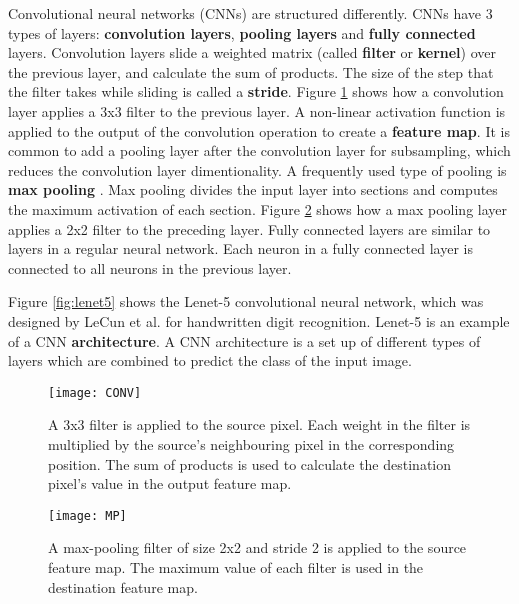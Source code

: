 Convolutional neural networks (CNNs) are structured differently. CNNs have 3 types of layers: \textbf{convolution layers}, \textbf{pooling layers} and \textbf{fully connected} layers. Convolution layers slide a weighted matrix (called \textbf{filter} or \textbf{kernel}) over the previous layer, and calculate the sum of products. The size of the step that the filter takes while sliding is called a \textbf{stride}. Figure \ref{fig:CONV} shows how a convolution layer applies a 3x3 filter to the previous layer. A non-linear activation function is applied to the output of the convolution operation to create a \textbf{feature map}. It is common to add a pooling layer after the convolution layer for subsampling, which reduces the convolution layer dimentionality. A frequently used type of pooling is \textbf{max pooling} \cite{weng1992cresceptron}. Max pooling divides the input layer into sections and computes the maximum activation of each section. Figure \ref{fig:MP} shows how a max pooling layer applies a 2x2 filter to the preceding layer. Fully connected layers are similar to layers in a regular neural network. Each neuron in a fully connected layer is connected to all neurons in the previous layer.

Figure \ref{fig:lenet5} shows the Lenet-5 convolutional neural network, which was designed by LeCun et al. \cite{lecun1998gradient} for handwritten digit recognition. Lenet-5 is an example of a CNN \textbf{architecture}. A CNN architecture is a set up of different types of layers which are combined to predict the class of the input image.

\begin{figure}[H]
\centering
\texttt{[image: CONV]}
\caption[A 3x3 filter is applied to the source pixel. Each weight in the filter is multiplied by the source's neighbouring pixel in the corresponding position. The sum of products is used to calculate the destination pixel's value in the output feature map.]{A 3x3 filter is applied to the source pixel. Each weight in the filter is multiplied by the source's neighbouring pixel in the corresponding position. The sum of products is used to calculate the destination pixel's value in the output feature map.\footnotemark}
\label{fig:CONV}
\end{figure}

\begin{figure}[H]
\centering
\texttt{[image: MP]}
\caption[A max-pooling filter of size 2x2 and stride 2 is applied to the source feature map. The maximum value of each filter is used in the destination feature map.]{A max-pooling filter of size 2x2 and stride 2 is applied to the source feature map. The maximum value of each filter is used in the destination feature map.\footnotemark}
\label{fig:MP}
\end{figure}

